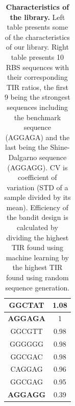\documentclass{article}
\begin{document}
\begin{table}[!h]
\begin{minipage}[c]{0.38\textwidth}
\begin{tabular}{|c|c|}
GGCTAT                & 1.08              \\ \hline
\textbf{AGGAGA}                & 1                  \\ \hline
GGCGTT                & 0.98            \\ \hline
GGGGGG                & 0.98             \\ \hline
GGCGAC                & 0.98             \\ \hline
CAGGAG                & 0.96             \\ \hline
GGCGAG                & 0.95             \\ \hline
\textbf{AGGAGG}       & 0.39            \\ \hline
\end{tabular}
\end{minipage}
\caption{\textbf{Characteristics of the library.}
Left table presents some of the characteristics of our library.
Right table presents 10 RBS sequences with their corresponding TIR ratios, the first 9 being the strongest sequences including the benchmark sequence (AGGAGA) and the last being the Shine-Dalgarno sequence (AGGAGG).
CV is coefficient of variation (STD of a sample divided by its mean).
Efficiency of the bandit design is calculated by dividing the highest TIR found using machine learning by the highest TIR found using random sequence generation. }
\end{table}
\end{document}
